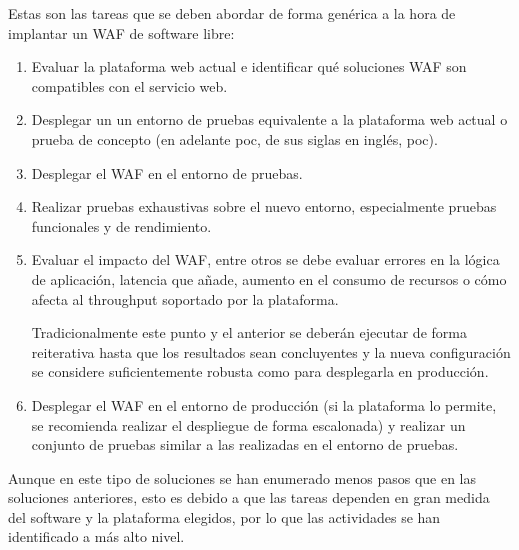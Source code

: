 \par Estas son las tareas que se deben abordar de forma genérica a la hora de implantar un WAF de software libre:
\begin{enumerate}
  \item Evaluar la plataforma web actual e identificar qué soluciones WAF son compatibles con el servicio web.
  \item Desplegar un un entorno de pruebas equivalente a la plataforma web actual o prueba de concepto (en adelante \acrshort{poc}, de sus
    siglas en inglés, \acrlong{poc}).
  \item Desplegar el WAF en el entorno de pruebas.
  \item Realizar pruebas exhaustivas sobre el nuevo entorno, especialmente pruebas funcionales y de rendimiento.
  \item Evaluar el impacto del WAF, entre otros se debe evaluar errores en la lógica de aplicación, latencia que añade, aumento en el consumo
    de recursos o cómo afecta al throughput soportado por la plataforma.
    \par Tradicionalmente este punto y el anterior se deberán ejecutar de forma reiterativa hasta que los resultados sean concluyentes y la
    nueva configuración se considere suficientemente robusta como para desplegarla en producción.
  \item Desplegar el WAF en el entorno de producción (si la plataforma lo permite, se recomienda realizar el despliegue de forma escalonada) y
    realizar un conjunto de pruebas similar a las realizadas en el entorno de pruebas.
\end{enumerate}

\par Aunque en este tipo de soluciones se han enumerado menos pasos que en las soluciones anteriores, esto es debido a que las tareas dependen
en gran medida del software y la plataforma elegidos, por lo que las actividades se han identificado a más alto nivel.

